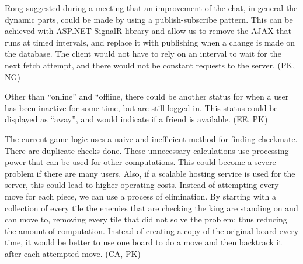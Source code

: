 \documentclass[acmlarge, review=false, screen=true]{acmart}
\begin{document}
  Rong suggested during a meeting that an improvement of the chat, in general the dynamic parts, could be made by using a publish-subscribe pattern. This can be achieved with ASP.NET SignalR library and allow us to remove the AJAX that runs at timed intervals, and replace it with publishing when a change is made on the database\cite{signalr}. The client would not have to rely on an interval to wait for the next fetch attempt, and there would not be constant requests to the server. (PK, NG)

  Other than “online” and “offline, there could be another status for when a user has been inactive for some time, but are still logged in. This status could be displayed as “away”, and would indicate if a friend is available. (EE, PK)

  The current game logic uses a naive and inefficient method for finding checkmate. There are duplicate checks done. These unnecessary calculations use processing power that can be used for other computations. This could become a severe problem if there are many users. Also, if a scalable hosting service is used for the server, this could lead to higher operating costs. Instead of attempting every move for each piece, we can use a process of elimination. By starting with a collection of every tile the enemies that are checking the king are standing on and can move to, removing every tile that did not solve the problem; thus reducing the amount of computation. Instead of creating a copy of the original board every time, it would be better to use one board to do a move and then backtrack it after each attempted move. (CA, PK)

  

    
  
\end{document}

